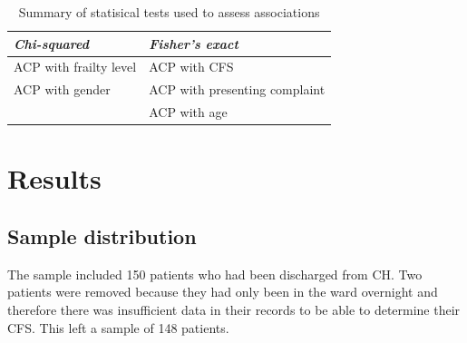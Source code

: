 \documentclass
[
	12pt,
	a4paper,
	oneside,
]{report}
\begin{document}
\begin{table}[ht]
\caption{Summary of statisical tests used to assess associations}
\label{tab:stat-tests}
\begin{tabular}{ l l }
\emph{Chi-squared} & \emph{Fisher's exact} \\
\hline
ACP with frailty level & ACP with CFS \\
ACP with gender & ACP with presenting complaint \\
 & ACP with age
\end{tabular}
\end{table}

%
%

%
%

% 
%


\chapter{Results}

\section{Sample distribution}

The sample included 150 patients who had been discharged from CH. Two patients
were removed because they had only been in the ward overnight and therefore
there was insufficient data in their records to be able to determine their
CFS. This left a sample of 148 patients. 
\end{document}
